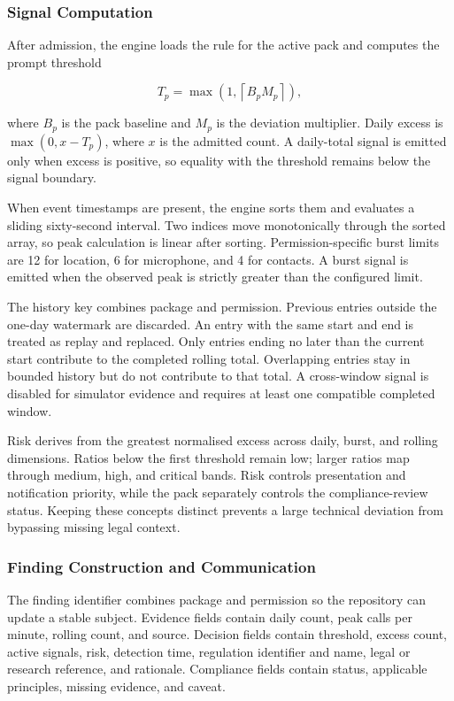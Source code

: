 \subsubsection{Signal Computation}

After admission, the engine loads the rule for the active pack and computes the prompt threshold

\begin{equation}
T_p=\max\left(1,\left\lceil B_pM_p\right\rceil\right),
\end{equation}

where \(B_p\) is the pack baseline and \(M_p\) is the deviation multiplier. Daily excess is \(\max(0,x-T_p)\), where \(x\) is the admitted count. A daily-total signal is emitted only when excess is positive, so equality with the threshold remains below the signal boundary.

When event timestamps are present, the engine sorts them and evaluates a sliding sixty-second interval. Two indices move monotonically through the sorted array, so peak calculation is linear after sorting. Permission-specific burst limits are 12 for location, 6 for microphone, and 4 for contacts. A burst signal is emitted when the observed peak is strictly greater than the configured limit.

The history key combines package and permission. Previous entries outside the one-day watermark are discarded. An entry with the same start and end is treated as replay and replaced. Only entries ending no later than the current start contribute to the completed rolling total. Overlapping entries stay in bounded history but do not contribute to that total. A cross-window signal is disabled for simulator evidence and requires at least one compatible completed window.

Risk derives from the greatest normalised excess across daily, burst, and rolling dimensions. Ratios below the first threshold remain low; larger ratios map through medium, high, and critical bands. Risk controls presentation and notification priority, while the pack separately controls the compliance-review status. Keeping these concepts distinct prevents a large technical deviation from bypassing missing legal context.

\subsubsection{Finding Construction and Communication}

The finding identifier combines package and permission so the repository can update a stable subject. Evidence fields contain daily count, peak calls per minute, rolling count, and source. Decision fields contain threshold, excess count, active signals, risk, detection time, regulation identifier and name, legal or research reference, and rationale. Compliance fields contain status, applicable principles, missing evidence, and caveat.

